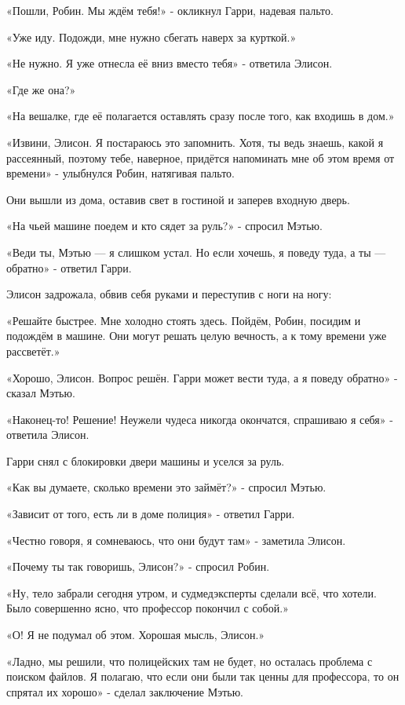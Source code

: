 \documentclass[a4paper,12pt]{book}
\begin{document}
\par
«Пошли, Робин. Мы ждём тебя!» - окликнул Гарри, надевая пальто.
\par
«Уже иду. Подожди, мне нужно сбегать наверх за курткой.»
\par
«Не нужно. Я уже отнесла её вниз вместо тебя» - ответила Элисон.
\par
«Где же она?»
\par
«На вешалке, где её полагается оставлять сразу после того, как входишь в дом.»
\par
«Извини, Элисон. Я постараюсь это запомнить. Хотя, ты ведь знаешь, какой я рассеянный, поэтому тебе, наверное, придётся напоминать мне об этом время от времени» - улыбнулся Робин, натягивая пальто.
\par
Они вышли из дома, оставив свет в гостиной и заперев входную дверь.
\par
«На чьей машине поедем и кто сядет за руль?» - спросил Мэтью.
\par
«Веди ты, Мэтью — я слишком устал. Но если хочешь, я поведу туда, а ты — обратно» - ответил Гарри.
\par
Элисон задрожала, обвив себя руками и переступив с ноги на ногу:
\par
«Решайте быстрее. Мне холодно стоять здесь. Пойдём, Робин, посидим и подождём в машине. Они могут решать целую вечность, а к тому времени уже рассветёт.»
\par
«Хорошо, Элисон. Вопрос решён. Гарри может вести туда, а я поведу обратно» - сказал Мэтью.
\par
«Наконец-то! Решение! Неужели чудеса никогда окончатся, спрашиваю я себя» - ответила Элисон.
\par
Гарри снял с блокировки двери машины и уселся за руль.
\par
«Как вы думаете, сколько времени это займёт?» - спросил Мэтью.
\par
«Зависит от того, есть ли в доме полиция» - ответил Гарри.
\par
«Честно говоря, я сомневаюсь, что они будут там» - заметила Элисон.
\par
«Почему ты так говоришь, Элисон?» - спросил Робин.
\par
«Ну, тело забрали сегодня утром, и судмедэксперты сделали всё, что хотели. Было совершенно ясно, что профессор покончил с собой.»
\par
«О! Я не подумал об этом. Хорошая мысль, Элисон.»
\par
«Ладно, мы решили, что полицейских там не будет, но осталась проблема с поиском файлов. Я полагаю, что если они были так ценны для профессора, то он спрятал их хорошо» - сделал заключение Мэтью.
\end{document}
